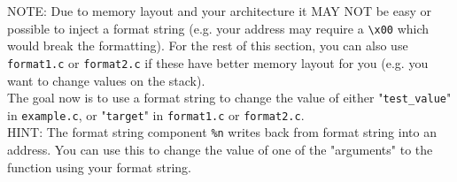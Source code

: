 \documentclass{article}
\begin{document}
\noindent NOTE: Due to memory layout and your architecture it MAY NOT be
easy or possible to inject a format string (e.g. your address may require a
\lstinline{\x00} which would break the formatting). For the rest of this section, you can also use \lstinline{format1.c} or \lstinline{format2.c} if these have better memory layout for you (e.g. you want to change values on the stack).\\


\noindent The goal now is to use a format string to change the value of either
"\lstinline{test_value}" in \lstinline{example.c}, or "\lstinline{target}" in \lstinline{format1.c} or \lstinline{format2.c}.\\

\noindent HINT: The format string component \lstinline{%n} writes back from format string
into an address. You can use this to change the value of one of the "arguments" to the function using your format string.
% 
% 
\end{document}
